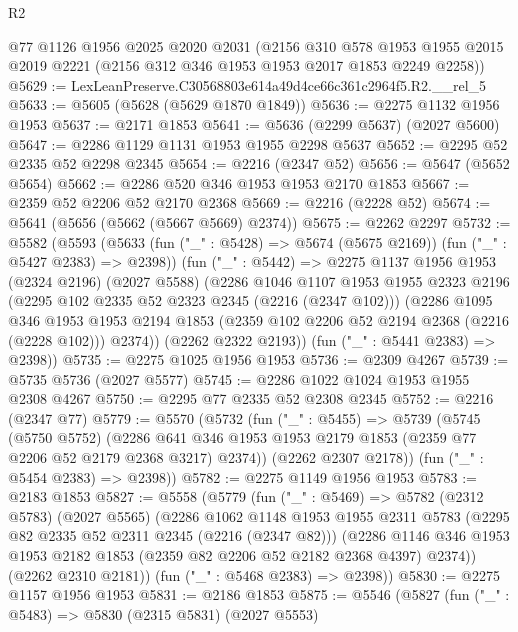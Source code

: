 \begin{lexlean}{R2}
\begin{coremodule}
    @77
    @1126
    @1956
    @2025
    @2020
    @2031
    (@2156
      @310
      @578
      @1953
      @1955
      @2015
      @2019
      @2221
      (@2156 @312 @346 @1953 @1953 @2017 @1853 @2249 @2258))
@5629 := LexLeanPreserve.C30568803e614a49d4ce66c361c2964f5.R2.__rel_5
@5633 := @5605 (@5628 (@5629 @1870 @1849))
@5636 := @2275 @1132 @1956 @1953
@5637 := @2171 @1853
@5641 := @5636 (@2299 @5637) (@2027 @5600)
@5647 := @2286 @1129 @1131 @1953 @1955 @2298 @5637
@5652 := @2295 @52 @2335 @52 @2298 @2345
@5654 := @2216 (@2347 @52)
@5656 := @5647 (@5652 @5654)
@5662 := @2286 @520 @346 @1953 @1953 @2170 @1853
@5667 := @2359 @52 @2206 @52 @2170 @2368
@5669 := @2216 (@2228 @52)
@5674 := @5641 (@5656 (@5662 (@5667 @5669) @2374))
@5675 := @2262 @2297
@5732 := @5582
    (@5593
      (@5633 (fun ("_" : @5428) => @5674 (@5675 @2169)) (fun ("_" : @5427 @2383) => @2398))
      (fun ("_" : @5442) =>
      @2275
        @1137
        @1956
        @1953
        (@2324 @2196)
        (@2027 @5588)
        (@2286
          @1046
          @1107
          @1953
          @1955
          @2323
          @2196
          (@2295 @102 @2335 @52 @2323 @2345 (@2216 (@2347 @102)))
          (@2286
            @1095
            @346
            @1953
            @1953
            @2194
            @1853
            (@2359 @102 @2206 @52 @2194 @2368 (@2216 (@2228 @102)))
            @2374))
        (@2262 @2322 @2193))
      (fun ("_" : @5441 @2383) => @2398))
@5735 := @2275 @1025 @1956 @1953
@5736 := @2309 @4267
@5739 := @5735 @5736 (@2027 @5577)
@5745 := @2286 @1022 @1024 @1953 @1955 @2308 @4267
@5750 := @2295 @77 @2335 @52 @2308 @2345
@5752 := @2216 (@2347 @77)
@5779 := @5570
    (@5732
      (fun ("_" : @5455) =>
      @5739
        (@5745
          (@5750 @5752)
          (@2286 @641 @346 @1953 @1953 @2179 @1853 (@2359 @77 @2206 @52 @2179 @2368 @3217) @2374))
        (@2262 @2307 @2178))
      (fun ("_" : @5454 @2383) => @2398))
@5782 := @2275 @1149 @1956 @1953
@5783 := @2183 @1853
@5827 := @5558
    (@5779
      (fun ("_" : @5469) =>
      @5782
        (@2312 @5783)
        (@2027 @5565)
        (@2286
          @1062
          @1148
          @1953
          @1955
          @2311
          @5783
          (@2295 @82 @2335 @52 @2311 @2345 (@2216 (@2347 @82)))
          (@2286 @1146 @346 @1953 @1953 @2182 @1853 (@2359 @82 @2206 @52 @2182 @2368 @4397) @2374))
        (@2262 @2310 @2181))
      (fun ("_" : @5468 @2383) => @2398))
@5830 := @2275 @1157 @1956 @1953
@5831 := @2186 @1853
@5875 := @5546
    (@5827
      (fun ("_" : @5483) =>
      @5830
        (@2315 @5831)
        (@2027 @5553)

\end{coremodule}
\end{lexlean}

